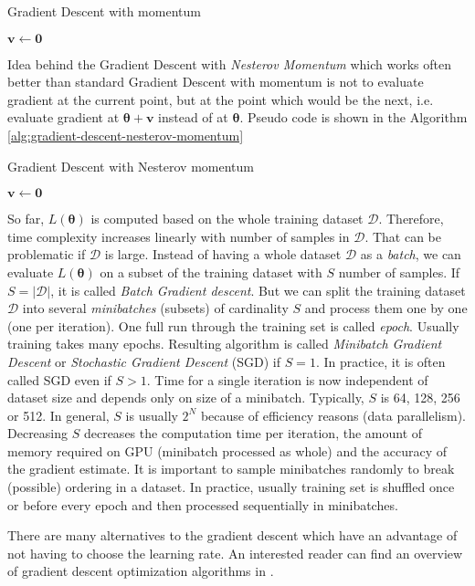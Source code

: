 \begin{algorithm}[htb]
\caption{Gradient Descent with momentum}
\label{alg:gradient-descent-momentum}


$\pmb v \leftarrow \pmb 0$\;
\end{algorithm}

Idea behind the Gradient Descent with \textit{Nesterov Momentum} which works often better than standard Gradient Descent with momentum is not to evaluate gradient at the current point, but at the point which would be the next, i.e. evaluate gradient at $\pmb \theta + \pmb v$ instead of at $\pmb \theta$. Pseudo code is shown in the Algorithm \ref{alg:gradient-descent-nesterov-momentum}

\begin{algorithm}[htb]
\caption{Gradient Descent with Nesterov momentum}
\label{alg:gradient-descent-nesterov-momentum}


$\pmb v \leftarrow \pmb 0$ \;
\end{algorithm}

So far, $L(\pmb \theta)$ is computed based on the whole training dataset $\mathcal{D}$. Therefore, time complexity increases linearly with number of samples in $\mathcal{D}$. That can be problematic if $\mathcal{D}$ is large. Instead of having a whole dataset $\mathcal{D}$ as a \textit{batch}, we can evaluate $L(\pmb \theta)$ on a subset of the training dataset with $S$ number of samples. If $S = |\mathcal{D}|$, it is called \textit{Batch Gradient descent}. But we can split the training dataset $\mathcal{D}$ into several \textit{minibatches} (subsets) of cardinality $S$ and process them one by one (one per iteration). One full run through the training set is called \textit{epoch}. Usually training takes many epochs. Resulting algorithm is called \textit{Minibatch Gradient Descent} or \textit{Stochastic Gradient Descent} (SGD) if $S = 1$. In practice, it is often called SGD even if $S > 1$. Time for a single iteration is now independent of dataset size and depends only on size of a minibatch. Typically, $S$ is 64, 128, 256 or 512. In general, $S$ is usually $2^{N}$ because of efficiency reasons (data parallelism). Decreasing $S$ decreases the computation time per iteration, the amount of memory required on GPU (minibatch processed as whole) and the accuracy of the gradient estimate. It is important to sample minibatches randomly to break (possible) ordering in a dataset. In practice, usually training set is shuffled once or before every epoch and then processed sequentially in minibatches. 


There are many alternatives to the gradient descent which have an advantage of not having to choose the learning rate. An interested reader can find an overview of gradient descent optimization algorithms in \cite{gradient-descent-overview}. 



